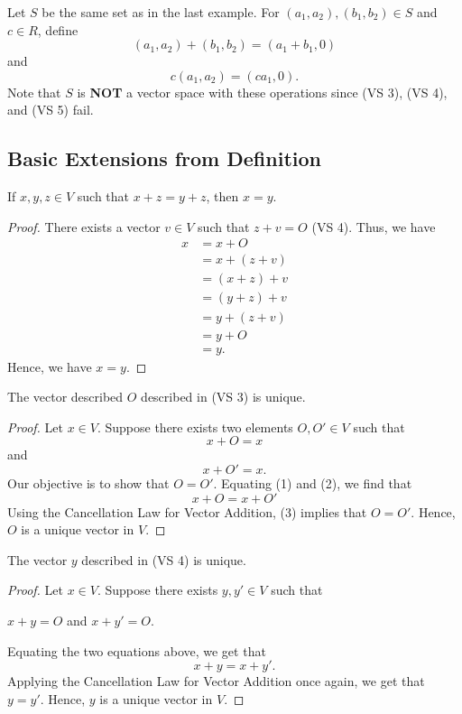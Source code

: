 \begin{eg}
    Let \( S  \) be the same set as in the last example. For \( (a_{1}, a_{2} ) , (b_{1}, b_{2}) \in S  \) and \( c \in R  \), define 
    \[  (a_{1}, a_{2} ) + (b_{1} , b_{2})  = ( a_{1} + b_{1} , 0 ) \]
    and 
    \[  c(a_{1}, a_{2}) = (ca_{1}, 0 ). \]
    Note that \( S  \) is \textbf{NOT} a vector space with these operations since (VS 3), (VS 4), and (VS 5) fail.
\end{eg}

\subsection{Basic Extensions from Definition}

\begin{theorem}
    If \( x,y,z \in V  \) such that \( x + z = y + z  \), then \( x = y  \).
\end{theorem}
\begin{proof}
There exists a vector \( v \in V  \) such that \( z + v = O  \) (VS 4). Thus, we have
    \begin{align*}
        x &= x + O  \\
            &= x + (z + v ) \\
            &= (x+ z) + v  \\
            &= (y+z) + v \\
            &= y + (z + v) \\
            &= y + O \\ 
            &= y.
    \end{align*}
    Hence, we have \( x = y  \).
\end{proof}

\begin{corollary}
    The vector described \( O  \) described in (VS 3) is unique.
\end{corollary}
\begin{proof}
    Let \( x \in V  \). Suppose there exists two elements \( O , O' \in V  \) such that
    \[  x + O = x  \tag{1} \]
    and 
    \[  x + O' = x.  \tag{2} \]
    Our objective is to show that \( O = O' \). Equating (1) and (2), we find that 
    \[  x  + O = x + O' \tag{3} \]
    Using the Cancellation Law for Vector Addition, (3) implies that \(  O = O' \). Hence, \(  O  \) is a unique vector in \( V  \).
\end{proof}

\begin{corollary}
   The vector \( y  \) described in (VS 4) is unique. 
\end{corollary}
\begin{proof}
    Let \( x \in V  \). Suppose there exists \( y , y' \in V  \) such that 
    \begin{center}
        \( x + y = O  \) and \( x + y' = O \).
    \end{center}
    Equating the two equations above, we get that 
    \[  x + y = x + y'.\] Applying the Cancellation Law for Vector Addition once again, we get that \(  y = y' \). Hence, \( y  \) is a unique vector in \( V  \).
\end{proof}

